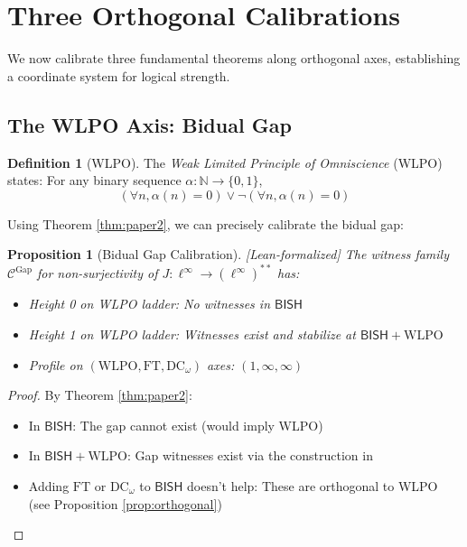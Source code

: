 \documentclass[11pt]{article}
\theoremstyle{plain}
\newtheorem{proposition}[theorem]{Proposition}
\theoremstyle{definition}
\newtheorem{definition}[theorem]{Definition}
\newcommand{\N}{\mathbb{N}}
\newcommand{\WLPO}{\mathrm{WLPO}}
\newcommand{\FT}{\mathrm{FT}}
\newcommand{\DCw}{\mathrm{DC}_\omega}
\newcommand{\BISH}{\mathsf{BISH}}
\newcommand{\linf}{\ell^\infty}
\newcommand{\leanok}{\textsf{\textcolor{green!70!black}{[Lean-formalized]}}}
\begin{document}
\section{Three Orthogonal Calibrations}

We now calibrate three fundamental theorems along orthogonal axes, establishing a coordinate system for logical strength.

\subsection{The WLPO Axis: Bidual Gap}

\begin{definition}[WLPO]\label{def:wlpo}
The \emph{Weak Limited Principle of Omniscience} (WLPO) states: For any binary sequence $\alpha: \N \to \{0,1\}$,
\[
(\forall n, \alpha(n) = 0) \vee \neg(\forall n, \alpha(n) = 0)
\]
\end{definition}

Using Theorem \ref{thm:paper2}, we can precisely calibrate the bidual gap:

\begin{proposition}[Bidual Gap Calibration]\label{prop:gap-height} \leanok
The witness family $\mathcal{C}^{\text{Gap}}$ for non-surjectivity of $J: \linf \to (\linf)^{**}$ has:
\begin{itemize}
\item Height 0 on WLPO ladder: No witnesses in $\BISH$
\item Height 1 on WLPO ladder: Witnesses exist and stabilize at $\BISH + \WLPO$
\item Profile on $(\WLPO, \FT, \DCw)$ axes: $(1, \infty, \infty)$
\end{itemize}
\end{proposition}

\begin{proof}
By Theorem \ref{thm:paper2}:
\begin{itemize}
\item In $\BISH$: The gap cannot exist (would imply WLPO)
\item In $\BISH + \WLPO$: Gap witnesses exist via the construction in \cite{Paper2}
\item Adding $\FT$ or $\DCw$ to $\BISH$ doesn't help: These are orthogonal to WLPO (see Proposition \ref{prop:orthogonal})
\end{itemize}
\end{proof}
\end{document}
